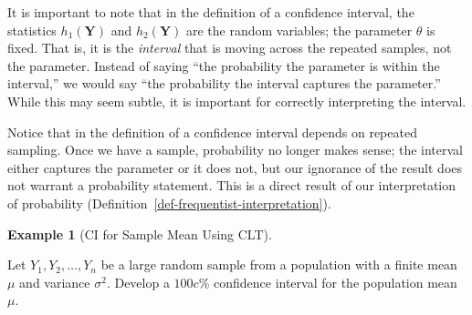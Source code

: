 \documentclass[
  letterpaper,
  DIV=11,
  numbers=noendperiod]{scrreprt}
\theoremstyle{plain}
\theoremstyle{definition}
\theoremstyle{definition}
\newtheorem{example}{Example}[chapter]
\theoremstyle{remark}
\begin{document}
\begin{tcolorbox}[enhanced jigsaw, toprule=.15mm, left=2mm, title=\textcolor{quarto-callout-warning-color}{\faExclamationTriangle}\hspace{0.5em}{Warning}, opacityback=0, toptitle=1mm, leftrule=.75mm, colbacktitle=quarto-callout-warning-color!10!white, opacitybacktitle=0.6, titlerule=0mm, breakable, colframe=quarto-callout-warning-color-frame, arc=.35mm, coltitle=black, bottomtitle=1mm, rightrule=.15mm, colback=white, bottomrule=.15mm]

It is important to note that in the definition of a confidence interval,
the statistics \(h_1(\mathbf{Y})\) and \(h_2(\mathbf{Y})\) are the
random variables; the parameter \(\theta\) is fixed. That is, it is the
\emph{interval} that is moving across the repeated samples, not the
parameter. Instead of saying ``the probability the parameter is within
the interval,'' we would say ``the probability the interval captures the
parameter.'' While this may seem subtle, it is important for correctly
interpreting the interval.

\end{tcolorbox}

Notice that in the definition of a confidence interval depends on
repeated sampling. Once we have a sample, probability no longer makes
sense; the interval either captures the parameter or it does not, but
our ignorance of the result does not warrant a probability statement.
This is a direct result of our interpretation of probability
(Definition~\ref{def-frequentist-interpretation}).

\begin{example}[CI for Sample Mean Using
CLT]\protect\hypertarget{exm-ci-clt}{}\label{exm-ci-clt}

Let \(Y_1, Y_2, \dotsc, Y_n\) be a large random sample from a population
with a finite mean \(\mu\) and variance \(\sigma^2\). Develop a
\(100c\)\% confidence interval for the population mean \(\mu\).

\end{example}
\end{document}
